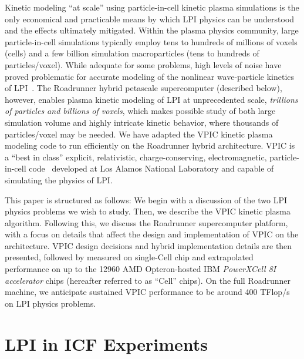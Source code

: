 \documentclass[10pt]{article}
\begin{document}
Kinetic modeling ``at scale'' using particle-in-cell kinetic plasma simulations is 
the only economical and practicable means by which LPI physics can be understood 
and the effects ultimately mitigated.  
Within the plasma physics community, large particle-in-cell simulations 
typically employ tens to hundreds of millions of voxels (cells) and a few 
billion simulation macroparticles (tens to hundreds of particles/voxel).  
While adequate for some problems, high levels of noise have proved problematic 
for accurate modeling of the nonlinear wave-particle kinetics of 
LPI~\cite{Yin_et_al_Phys_Plasmas_2006}.  
The Roadrunner hybrid petascale supercomputer (described below), however, 
enables plasma kinetic modeling of LPI at unprecedented 
scale, \textit{trillions of particles and billions of voxels}, which 
makes possible study of both large simulation 
volume and highly intricate kinetic behavior, where thousands of particles/voxel 
may be needed.  
We have adapted the VPIC kinetic plasma modeling code to run efficiently on the
Roadrunner hybrid architecture.  VPIC is a ``best in class'' explicit, relativistic, 
charge-conserving, electromagnetic, particle-in-cell code~\cite{Bowers_et_al_Phys_Plasmas_2007} developed at
Los Alamos National Laboratory and capable of simulating the physics of LPI. 

This paper is structured as follows:  We begin with a discussion of the two LPI 
physics problems we wish to study.  Then, we describe the VPIC 
kinetic plasma algorithm.  Following this, we discuss the Roadrunner supercomputer platform, 
with a focus on details that affect the design and implementation of
VPIC on the architecture.   VPIC design decisions and hybrid implementation details 
are then presented, followed by measured on single-Cell chip and extrapolated performance 
on up to the 12960 AMD Opteron-hosted IBM \emph{PowerXCell 8I accelerator} chips (hereafter 
referred to as ``Cell'' chips).  On the full Roadrunner machine, we anticipate 
sustained VPIC performance to be around 400 TFlop/s on LPI physics problems. 



\section*{LPI in ICF Experiments}
\end{document}
